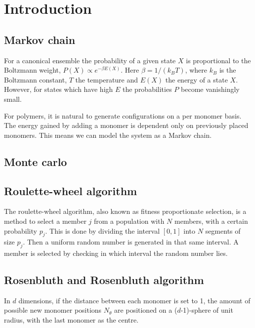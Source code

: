 \section{Introduction}


\subsection{Markov chain}
For a canonical ensemble the probability of a given state $X$ is proportional to the Boltzmann weight, $P(X) \propto e^{-\beta E(X)}$. Here $\beta=1/\left(k_B T\right)$, where $k_B$ is the Boltzmann constant, $T$ the temperature and $E(X)$ the energy of a state $X$. However, for states which have high $E$ the probabilities $P$ become vanishingly small. 

For polymers, it is natural to generate configurations on a per monomer basis. The energy gained by adding a monomer is dependent only on previously placed monomers. This means we can model the system as a Markov chain.

\subsection{Monte carlo}

\subsection{Roulette-wheel algorithm}
The roulette-wheel algorithm, also known as fitness proportionate selection, is a method to select a member $j$ from a population with $N$ members, with a certain probability $p_j$. This is done by dividing the interval $[0,1]$ into $N$ segments of size $p_j$. Then a uniform random number is generated in that same interval. A member is selected by checking in which interval the random number lies.

\subsection{Rosenbluth and Rosenbluth algorithm}
In $d$ dimensions, if the distance between each monomer is set to 1, the amount of possible new monomer positions $N_{\theta}$ are positioned on a ($d$-1)-sphere of unit radius, with the last monomer as the centre.